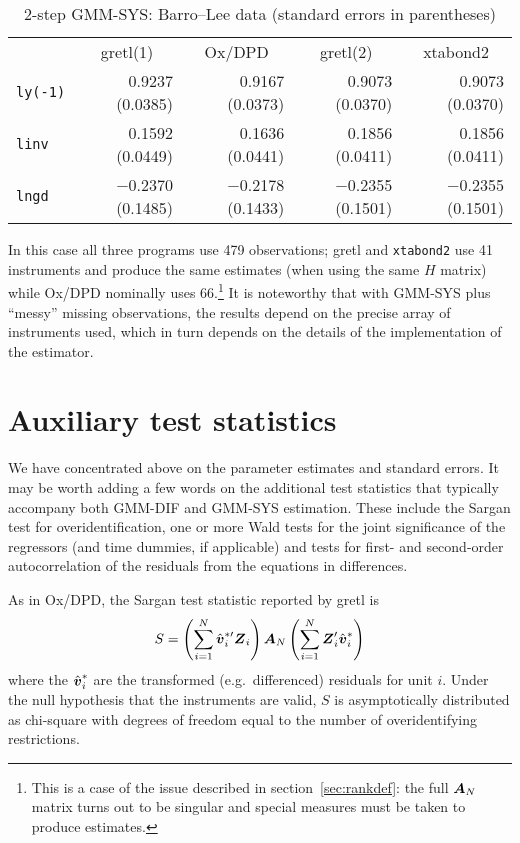 \begin{table}[htbp]
\begin{center}
\begin{tabular}{lrrrr}
& \multicolumn{1}{c}{gretl(1)} & 
  \multicolumn{1}{c}{Ox/DPD} &
  \multicolumn{1}{c}{gretl(2)} & 
  \multicolumn{1}{c}{xtabond2} \\
\texttt{ly(-1)} & 0.9237 (0.0385) & 
  0.9167 (0.0373) & 
    0.9073 (0.0370) &
      0.9073 (0.0370) \\
\texttt{linv} & 0.1592 (0.0449) & 
  0.1636 (0.0441) & 
    0.1856 (0.0411) &
      0.1856 (0.0411) \\
\texttt{lngd} & $-$0.2370 (0.1485) & 
  $-$0.2178 (0.1433) & 
    $-$0.2355 (0.1501) &
      $-$0.2355 (0.1501) 
\end{tabular}
\caption{2-step GMM-SYS: Barro--Lee data (standard errors in parentheses)}
\label{tab:growth-SYS}
\end{center}
\end{table}

In this case all three programs use 479 observations; gretl and
\texttt{xtabond2} use 41 instruments and produce the same estimates
(when using the same $H$ matrix) while Ox/DPD nominally uses
66.\footnote{This is a case of the issue described in
  section~\ref{sec:rankdef}: the full $\boldsymbol{A}_N$ matrix turns out to be
  singular and special measures must be taken to produce estimates.}
It is noteworthy that with GMM-SYS plus ``messy'' missing
observations, the results depend on the precise array of instruments
used, which in turn depends on the details of the implementation of
the estimator.

\section{Auxiliary test statistics}
\label{sec:dpanel-aux}

We have concentrated above on the parameter estimates and standard
errors. It may be worth adding a few words on the additional test
statistics that typically accompany both GMM-DIF and GMM-SYS
estimation. These include the Sargan test for overidentification, one
or more Wald tests for the joint significance of the regressors (and time
dummies, if applicable) and tests for first- and second-order
autocorrelation of the residuals from the equations in differences.

As in Ox/DPD, the Sargan test statistic reported by gretl is
\[
  S = \left(\sum_{i=1}^N \hat{\boldsymbol{v}}^{*\prime}_i \boldsymbol{Z}_i\right)  
   \boldsymbol{A}_N \left(\sum_{i=1}^N \boldsymbol{Z}_i' \hat{\boldsymbol{v}}^*_i\right)
\]
where the $\hat{\boldsymbol{v}}^*_i$ are the transformed (e.g.\ differenced)
residuals for unit $i$.  Under the null hypothesis that the
instruments are valid, $S$ is asymptotically distributed as chi-square
with degrees of freedom equal to the number of overidentifying
restrictions.

